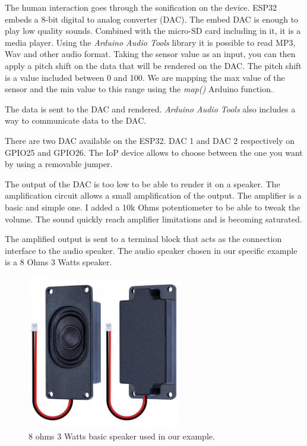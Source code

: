 The human interaction goes through the sonification on the device. ESP32 embeds a 8-bit digital to analog converter (DAC).
The embed DAC is enough to play low quality sounds. Combined with the micro-SD card including in it, it is a media player.
Using the \textit{Arduino Audio Tools} library it is possible to read MP3, Wav and other audio format.
Taking the sensor value as an input, you can then apply a pitch shift on the data that will be rendered on the DAC.
The pitch shift is a value included between 0 and 100. We are mapping the max value of the sensor and the min value
to this range using the \textit{map()} Arduino function.

The data is sent to the DAC and rendered. \textit{Arduino Audio Tools} also includes a way to communicate data to the
DAC.


There are two DAC available on the ESP32. DAC 1 and DAC 2 respectively on GPIO25 and GPIO26. The IoP device allows
to choose between the one you want by using a removable jumper.

The output of the DAC is too low to be able to render it on a speaker. The amplification circuit allows a small
amplification of the output. The amplifier is a basic and simple one. I added a 10k Ohms potentiometer to be able to
tweak the volume. The sound quickly reach amplifier limitations and is becoming saturated.

The amplified output is sent to a terminal block that acts as the connection interface to the audio speaker.
The audio speaker chosen in our specific example is a 8 Ohms 3 Watts speaker.

\begin{figure}[h!]
    \centering
    \includegraphics[width=0.6\textwidth]{images/speaker.jpg}
    \caption{8 ohms 3 Watts basic speaker used in our example.}
    \vspace{0.1cm}
    \label{fig:speaker}
\end{figure}


